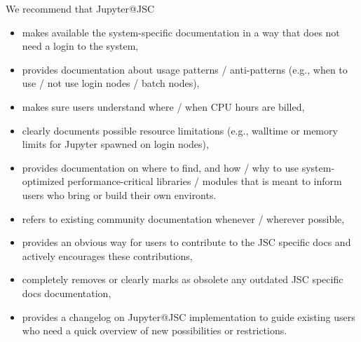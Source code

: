 We recommend that Jupyter@JSC
\begin{itemize}
  \item makes available the system-specific documentation in a way that does not need a login to the system,
  \item provides documentation about usage patterns / anti-patterns (e.g., when to use / not use login nodes / batch nodes),
  \item makes sure users understand where / when CPU hours are billed,
  \item clearly documents possible resource limitations (e.g., walltime or memory limits for Jupyter spawned on login nodes),
  \item provides documentation on where to find, and how / why to use system-optimized performance-critical libraries / modules that is meant to inform users who bring or build their own environts.
  \item refers to existing community documentation whenever / wherever possible,
  \item provides an obvious way for users to contribute to the JSC specific docs and actively encourages these contributions,
  \item completely removes or clearly marks as obsolete any outdated JSC specific docs documentation,
  \item provides a changelog on Jupyter@JSC implementation to guide existing users who need a quick overview of new possibilities or restrictions.
\end{itemize}
